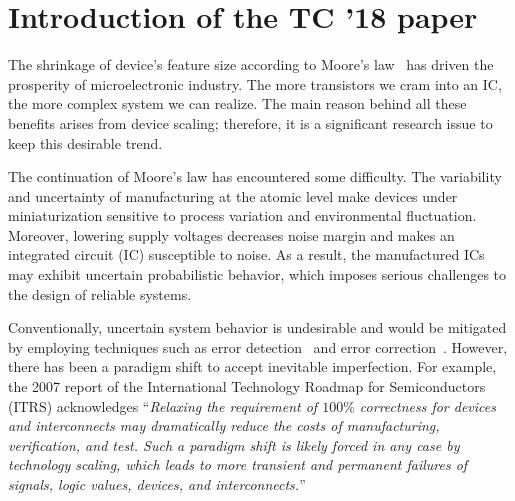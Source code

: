     \section{Introduction of the TC '18 paper}
    The shrinkage of device's feature size according to Moore's law~\cite{Moore1965} has driven the prosperity of microelectronic industry.
    The more transistors we cram into an IC, the more complex system we can realize.
    The main reason behind all these benefits arises from device scaling;
    therefore, it is a significant research issue to keep this desirable trend.

    The continuation of Moore's law has encountered some difficulty.
    The variability and uncertainty of manufacturing at the atomic level make devices under miniaturization sensitive to process variation and environmental fluctuation.
    Moreover, lowering supply voltages decreases noise margin and makes an integrated circuit (IC) susceptible to noise.
    As a result, the manufactured ICs may exhibit uncertain probabilistic behavior,
    which imposes serious challenges to the design of reliable systems.

    Conventionally, uncertain system behavior is undesirable and would be mitigated by employing techniques such as error detection~\cite{Constantinescu2003} and error correction~\cite{Mitra2006}.
    However, there has been a paradigm shift to accept inevitable imperfection.
    For example, the 2007 report of the International Technology Roadmap for Semiconductors (ITRS)
    acknowledges
    ``\textit{Relaxing the requirement of $100\%$ correctness for devices and interconnects may dramatically reduce the costs of manufacturing, verification, and test.
        Such a paradigm shift is likely forced in any case by technology scaling, which leads to more transient and permanent failures of signals, logic values, devices, and interconnects.}''

